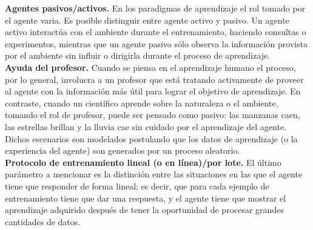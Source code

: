 \textbf{Agentes pasivos/activos.} En los paradigmas de aprendizaje
el rol tomado por el agente varia. Es posible distinguir entre
agente activo y pasivo. Un agente activo interactúa
con el ambiente durante el entrenamiento, haciendo consultas o
experimentos, mientras que un agente pasivo sólo observa la
información provista por el ambiente sin influir
o dirigirla durante el proceso de aprendizaje.\\

\textbf{Ayuda del profesor.} Cuando se piensa en el aprendizaje humano
el proceso, por lo general, involucra a un profesor que está tratando
activamente de proveer al agente con la información más útil para
lograr el objetivo de aprendizaje. En contraste, cuando un científico
aprende sobre la naturaleza o el ambiente, tomando el rol de profesor,
puede ser pensado como pasivo: las manzanas caen, las estrellas
brillan y la lluvia cae sin cuidado por el aprendizaje del agente.
Dichos escenarios son modelados postulando que los datos de
aprendizaje (o la experiencia del agente) son generados por un proceso
aleatorio.\\

\textbf{Protocolo de entrenamiento lineal (o en línea)/por lote.} El
último parámetro a mencionar es la distinción entre las situaciones en
las que el agente tiene que responder de forma lineal; es decir, que
para cada ejemplo de entrenamiento tiene que dar una respuesta, y
el agente tiene que mostrar el aprendizaje adquirido después de
tener la oportunidad de procesar grandes cantidades de datos.
